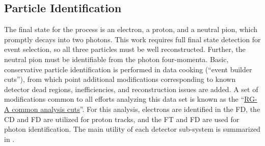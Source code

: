 \subsection{Particle Identification}\label{sec:pid}
    The final state for the \dvpip process is an electron, a proton, and a neutral pion, which promptly decays into two photons. This work requires full final state detection for event selection, so all three particles must be well reconstructed. Further, the neutral pion must be identifiable from the photon four-momenta. Basic, conservative particle identification is performed in data cooking (``event builder cuts''), from which point additional modifications corresponding to known detector dead regions, inefficiencies, and reconstruction issues are added. A set of modifications common to all efforts analyzing this data set is known as the ``\href{https://www.overleaf.com/project/5ea737720942930001ff5e9c}{RG-A common analysis cuts}''. For this analysis, electrons are identified in the FD, the CD and FD are utilized for proton tracks, and the FT and FD are used for photon identification. The main utility of each detector sub-system is summarized in .
 

